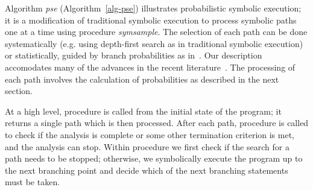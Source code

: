 
Algorithm {\em pse} (Algorithm~\ref{alg-pse}) illustrates probabilistic symbolic execution;
it is a modification of traditional symbolic execution to process symbolic paths one at a time using procedure {\em symsample}.
The selection of each path can be done systematically (e.g. using depth-first search as in traditional symbolic execution) or statistically, 
guided by branch probabilities as in~\cite{filieri2014statistical}. 
Our description accomodates many of the advances in the recent literature~\cite{filieri2014statistical,Filieri2013}.
The processing of each path involves the calculation of probabilities as described in
the next section.

At a high level, procedure  is called from the initial state of the program; %
it returns a single path which is then processed.  After each path, procedure  is called to check if the analysis is complete or some other termination criterion is met, 
and the analysis can stop. Within procedure  we first check if the search for a path needs to be stopped; otherwise, we symbolically execute the program up to the next branching 
point and decide which of the next branching statements must be taken. 

